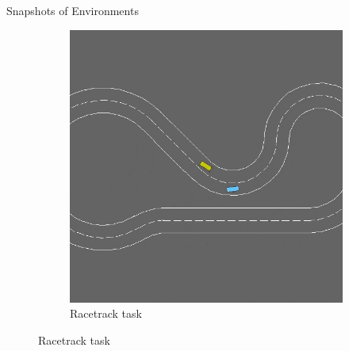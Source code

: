 \documentclass{beamer}
\begin{document}
\begin{frame}{Snapshots of Environments}
\begin{figure}[t]
\begin{subfigure}{0.315\textwidth}
        \includegraphics[width=\textwidth]{figs/racetrack.png}
        \caption{Racetrack task}
        \label{Fig_racetrack}
    \end{subfigure}
    \label{Fig_Highway_Farama}
\end{figure}
\end{frame}
\end{document}
